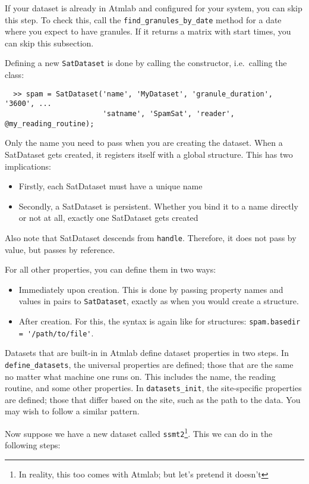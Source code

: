 \documentclass[a4paper,10pt]{article}
\begin{document}
If your dataset is already in Atmlab and configured for your system, you
can skip this step.
To check this, call the \lstinline|find_granules_by_date| method for a
date where you expect to have granules.
If it returns a matrix with start times, you can skip this subsection.

Defining a new \lstinline|SatDataset| is done by calling the constructor,
i.e.\ calling the class:

\begin{lstlisting}
  >> spam = SatDataset('name', 'MyDataset', 'granule_duration', '3600', ...
                       'satname', 'SpamSat', 'reader', @my_reading_routine);
\end{lstlisting}

Only the name you need to pass when you are creating the dataset.
When a SatDataset gets created, it registers itself with a global
structure.
This has two implications:
\begin{itemize}
\item Firstly, each SatDataset must have a unique name
\item Secondly, a SatDataset is persistent.
Whether you bind it to a name directly or not at all, exactly one
SatDataset gets created
\end{itemize}
Also note that SatDataset descends from \lstinline|handle|.
Therefore, it does not pass by value, but passes by reference.

For all other properties, you can define them in two ways:

\begin{itemize}
\item Immediately upon creation.
This is done by passing property names and values in pairs to
\lstinline|SatDataset|, exactly as when you would create a structure.
\item After creation.
For this, the syntax is again like for structures:
\lstinline|spam.basedir = '/path/to/file'|.
\end{itemize}

Datasets that are built-in in Atmlab define dataset properties in two
steps.
In \lstinline|define_datasets|, the universal properties are defined;
those that are the same no matter what machine one runs on.
This includes the name, the reading routine, and some other properties.
In \lstinline|datasets_init|, the site-specific properties are defined;
those that differ based on the site, such as the path to the data.
You may wish to follow a similar pattern.

Now suppose we have a new dataset called \lstinline|ssmt2|\footnote{In
reality, this too comes with Atmlab; but let's pretend it doesn't}.
This we can do in the following steps:
\end{document}
